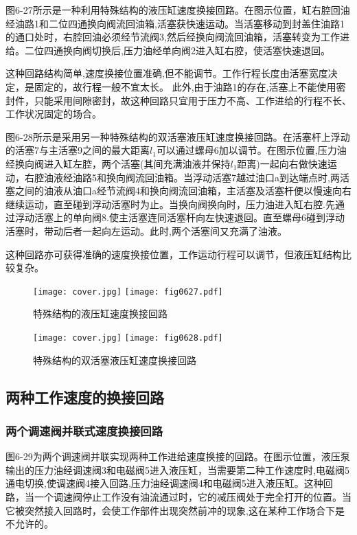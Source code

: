 图6-27所示是一种利用特殊结构的液压缸速度换接回路。在图示位置，缸右腔回油经油路1和二位四通换向阀流回油箱,活塞获快速运动。当活塞移动到封盖住油路1的通口处时，右腔回油必须经节流阀3,然后经换向阀流回油箱，活塞转变为工作进给。二位四通换向阀切换后,压力油经单向阀2进入缸右腔，使活塞快速退回。

这种回路结构简单,速度换接位置准确,但不能调节。工作行程长度由活塞宽度决定，是固定的，故行程一般不宜太长。 此外,由于油路1的存在,活塞上不能使用密封件，只能采用间隙密封，故这种回路只宜用于压力不高、工作进给的行程不长、工作状况固定的场合。

图6-28所示是采用另一种特殊结构的双活塞液压缸速度换接回路。在活塞杆上浮动的活塞7与主活塞9之间的最大距离$l_{1}$可以通过螺母6加以调节。在图示位置,压力油经换向阀进入缸左腔，两个活塞(其间充满油液并保持$l_{1}$距离)一起向右做快速运动，右腔油液经油路5和换向阀流回油箱。当浮动活塞7越过油口a到达端点时,两活塞之间的油液从油口a经节流阀4和换向阀流回油箱，主活塞及活塞杆便以慢速向右继续运动，直至碰到浮动活塞时为止。当换向阀换向时，压力油进入缸右腔.先通过浮动活塞上的单向阀8.使主活塞连同活塞杆向左快速退回。直至螺母6碰到浮动活塞时，带动后者一起向左运动。此时,两个活塞间又充满了油液。

这种回路亦可获得准确的速度换接位置，工作运动行程可以调节，但液压缸结构比较复杂。

\begin{figure}
\centering
\ifOpenSource
\texttt{[image: cover.jpg]}
\else
\texttt{[image: fig0627.pdf]}
\fi
\caption{特殊结构的液压缸速度换接回路}
\label{fig:fig0627}
\end{figure}

\begin{figure}
\centering
\ifOpenSource
\texttt{[image: cover.jpg]}
\else
\texttt{[image: fig0628.pdf]}
\fi
\caption{特殊结构的双活塞液压缸速度换接回路}
\label{fig:fig0628}
\end{figure}

\subsection{两种工作速度的换接回路}

\subsubsection{两个调速阀并联式速度换接回路}

图6-29为两个调速阀并联实现两种工作进给速度换接的回路。在图示位置，液压泵输出的压力油经调速阀3和电磁阀5进入液压缸，当需要第二种工作速度时,电磁阀5通电切换,使调速阀4接入回路,压力油经调速阀4和电磁阀5进入液压缸。这种回路，当一个调速阀停止工作没有油流通过时，它的减压阀处于完全打开的位置。当它被突然接入回路时，会使工作部件出现突然前冲的现象,这在某种工作场合下是不允许的。


